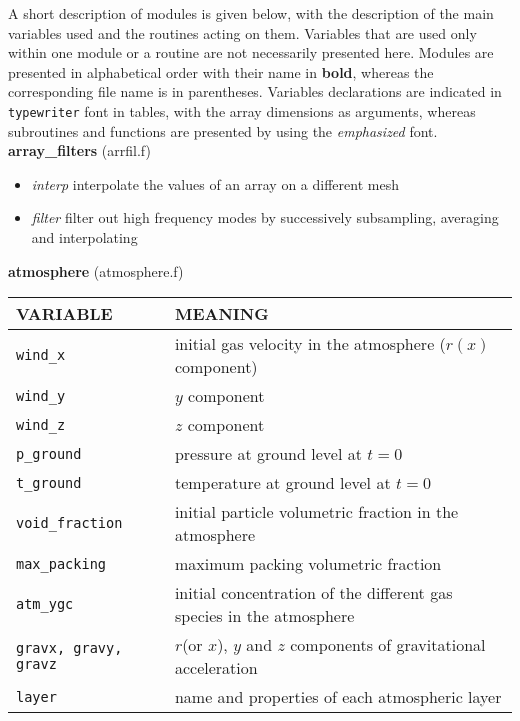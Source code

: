 A short description of modules is given below, with the description of the main 
variables used and the routines acting on them. Variables that are used only within one
module or a routine are not necessarily presented here.
Modules are presented in alphabetical order with their name in {\bf bold}, whereas the corresponding
file name is in parentheses. 
Variables declarations are indicated in {\tt typewriter} font in tables, 
with the array dimensions as arguments, whereas subroutines and functions
are presented by using the {\em emphasized} font.\\[5mm]
%
%
{\large {\bf array\_filters}} (arrfil.f)\\[5mm]
\begin{itemize}
\item {\em interp} interpolate the values of an array on a different mesh
\item{\em filter} filter out high frequency modes by successively subsampling, averaging and interpolating
\end{itemize}
%
%
{\large {\bf atmosphere}} (atmosphere.f)\\[5mm]
\begin{tabular}{|p{6cm}|p{6cm}|} \hline
VARIABLE & MEANING\\\hline
\tt wind\_x         & initial gas velocity in the atmosphere ($r(x)$ component)\\\hline
\tt wind\_y         & $y$ component\\\hline
\tt wind\_z         & $z$ component\\\hline
\tt p\_ground         & pressure at ground level at $t=0$\\ \hline
\tt t\_ground         & temperature at ground level at $t=0$\\ \hline
\tt void\_fraction    & initial particle volumetric fraction in the atmosphere\\\hline
\tt max\_packing      & maximum packing volumetric fraction \\\hline
\tt atm\_ygc          & initial concentration of the different gas species in the atmosphere \\\hline
\tt gravx, gravy, gravz & $r$(or $x$), $y$ and $z$ components of gravitational acceleration\\ \hline
\tt layer             & name and properties of each atmospheric layer\\ \hline
\end{tabular}\\


